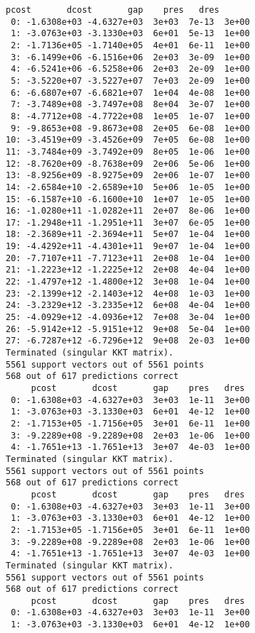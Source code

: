 \documentclass[11pt]{article}
\begin{document}
    \begin{Verbatim}[commandchars=\\\{\}]
     pcost       dcost       gap    pres   dres
 0: -1.6308e+03 -4.6327e+03  3e+03  7e-13  3e+00
 1: -3.0763e+03 -3.1330e+03  6e+01  5e-13  1e+00
 2: -1.7136e+05 -1.7140e+05  4e+01  6e-11  1e+00
 3: -6.1499e+06 -6.1516e+06  2e+03  3e-09  1e+00
 4: -6.5241e+06 -6.5258e+06  2e+03  2e-09  1e+00
 5: -3.5220e+07 -3.5227e+07  7e+03  2e-09  1e+00
 6: -6.6807e+07 -6.6821e+07  1e+04  4e-08  1e+00
 7: -3.7489e+08 -3.7497e+08  8e+04  3e-07  1e+00
 8: -4.7712e+08 -4.7722e+08  1e+05  1e-07  1e+00
 9: -9.8653e+08 -9.8673e+08  2e+05  6e-08  1e+00
10: -3.4519e+09 -3.4526e+09  7e+05  6e-08  1e+00
11: -3.7484e+09 -3.7492e+09  8e+05  1e-06  1e+00
12: -8.7620e+09 -8.7638e+09  2e+06  5e-06  1e+00
13: -8.9256e+09 -8.9275e+09  2e+06  1e-07  1e+00
14: -2.6584e+10 -2.6589e+10  5e+06  1e-05  1e+00
15: -6.1587e+10 -6.1600e+10  1e+07  1e-05  1e+00
16: -1.0280e+11 -1.0282e+11  2e+07  8e-06  1e+00
17: -1.2948e+11 -1.2951e+11  3e+07  6e-05  1e+00
18: -2.3689e+11 -2.3694e+11  5e+07  1e-04  1e+00
19: -4.4292e+11 -4.4301e+11  9e+07  1e-04  1e+00
20: -7.7107e+11 -7.7123e+11  2e+08  1e-04  1e+00
21: -1.2223e+12 -1.2225e+12  2e+08  4e-04  1e+00
22: -1.4797e+12 -1.4800e+12  3e+08  1e-04  1e+00
23: -2.1399e+12 -2.1403e+12  4e+08  1e-03  1e+00
24: -3.2329e+12 -3.2335e+12  6e+08  4e-04  1e+00
25: -4.0929e+12 -4.0936e+12  7e+08  3e-04  1e+00
26: -5.9142e+12 -5.9151e+12  9e+08  5e-04  1e+00
27: -6.7287e+12 -6.7296e+12  9e+08  2e-03  1e+00
Terminated (singular KKT matrix).
5561 support vectors out of 5561 points
568 out of 617 predictions correct
     pcost       dcost       gap    pres   dres
 0: -1.6308e+03 -4.6327e+03  3e+03  1e-11  3e+00
 1: -3.0763e+03 -3.1330e+03  6e+01  4e-12  1e+00
 2: -1.7153e+05 -1.7156e+05  3e+01  6e-11  1e+00
 3: -9.2289e+08 -9.2289e+08  2e+03  1e-06  1e+00
 4: -1.7651e+13 -1.7651e+13  3e+07  4e-03  1e+00
Terminated (singular KKT matrix).
5561 support vectors out of 5561 points
568 out of 617 predictions correct
     pcost       dcost       gap    pres   dres
 0: -1.6308e+03 -4.6327e+03  3e+03  1e-11  3e+00
 1: -3.0763e+03 -3.1330e+03  6e+01  4e-12  1e+00
 2: -1.7153e+05 -1.7156e+05  3e+01  6e-11  1e+00
 3: -9.2289e+08 -9.2289e+08  2e+03  1e-06  1e+00
 4: -1.7651e+13 -1.7651e+13  3e+07  4e-03  1e+00
Terminated (singular KKT matrix).
5561 support vectors out of 5561 points
568 out of 617 predictions correct
     pcost       dcost       gap    pres   dres
 0: -1.6308e+03 -4.6327e+03  3e+03  1e-11  3e+00
 1: -3.0763e+03 -3.1330e+03  6e+01  4e-12  1e+00

\end{Verbatim}
\end{document}
